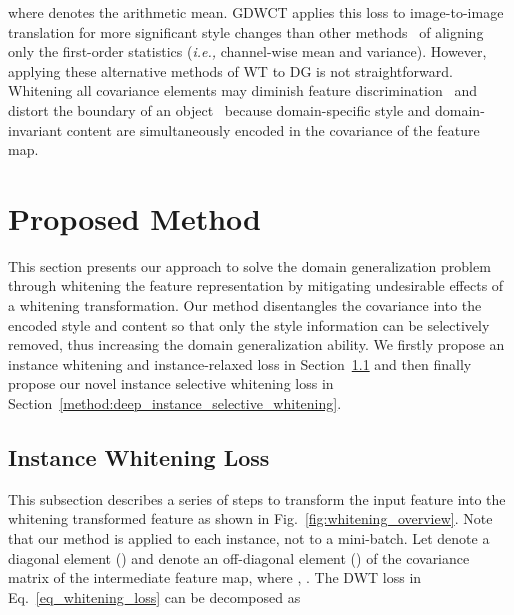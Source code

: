 \documentclass[final]{latex/cvpr}
\begin{document}
where  denotes the arithmetic mean.
GDWCT applies this loss to image-to-image translation for more significant style changes than other methods~\cite{huang2018multimodal,lee2018diverse} of aligning only the first-order statistics (\textit{i.e.,} channel-wise mean and variance).
However, applying these alternative methods of WT to DG is not straightforward. Whitening all covariance elements may diminish feature discrimination~\cite{pan2019switchable,wadia2020whitening} and distort the boundary of an object~\cite{li2018closed,li2017universal} because domain-specific style and domain-invariant content are simultaneously encoded in the covariance of the feature map.



\vspace{-0.0cm}
\section{Proposed Method}\label{sec:proposed_method}
\vspace{-0.05cm}
This section presents our approach to solve the domain generalization problem through whitening the feature representation by mitigating undesirable effects of a whitening transformation.
Our method disentangles the covariance into the encoded style and content so that only the style information can be selectively removed, thus increasing the domain generalization ability. We firstly propose an instance whitening and instance-relaxed loss in Section~\ref{method:deep_instance_whitening} and then finally propose our novel instance selective whitening loss in Section~\ref{method:deep_instance_selective_whitening}.
\vspace{-0.05cm}
\subsection{Instance Whitening Loss}\label{method:deep_instance_whitening}
\vspace{-0.1cm}
This subsection describes a series of steps to transform the input feature into the whitening transformed feature as shown in Fig.~\ref{fig:whitening_overview}. Note that our method is applied to each instance, not to a mini-batch.
Let  denote a diagonal element () and  denote an off-diagonal element () of the covariance matrix  of the intermediate feature map, where , .
The DWT loss in Eq.~\eqref{eq_whitening_loss} 
can be decomposed as
\vspace{-0.05cm}
\end{document}
